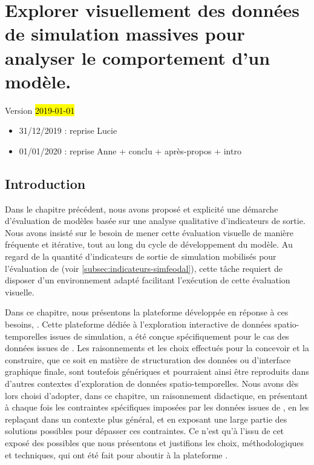 \setcounter{chapter}{3}
\graphicspath{{chap4/}}

\chapter{Explorer visuellement des données de simulation massives pour analyser le comportement d'un modèle.}
\label{chap:chap4}
\begin{center}
{\large Version \hl{2019-01-01}}
\end{center}
\begin{itemize}
	\item 31/12/2019 : reprise Lucie
	\item 01/01/2020 : reprise Anne + conclu + après-propos + intro
\end{itemize} 
\setcounter{minitocdepth}{2}
\minitoc
\clearpage
{}

\section*{Introduction}

Dans le chapitre précédent, nous avons proposé et explicité une démarche d'évaluation de modèles basée sur une analyse qualitative d'indicateurs de sortie.
Nous avons insisté sur le besoin de mener cette \og évaluation visuelle\fg{} de manière fréquente et itérative, tout au long du cycle de développement du modèle.
Au regard de la quantité d'indicateurs de sortie de simulation mobilisés pour l'évaluation de \simfeodal{} (voir \cref{subsec:indicateurs-simfeodal}), cette tâche requiert de disposer d'un environnement adapté facilitant l'exécution de cette évaluation visuelle.

Dans ce chapitre, nous présentons la plateforme développée en réponse à ces besoins, \simedb{}.
Cette plateforme dédiée à l'exploration interactive de données spatio-temporelles issues de simulation, a été conçue spécifiquement pour le cas des données issues de \simfeodal{}.
Les raisonnements et les choix effectués pour la concevoir et la construire, que ce soit en matière de structuration des données ou d'interface graphique finale, sont toutefois génériques et pourraient ainsi être reproduits dans d'autres contextes d'exploration de données spatio-temporelles.
Nous avons dès lors choisi d'adopter, dans ce chapitre, un raisonnement didactique, en présentant à chaque fois les contraintes spécifiques imposées par les données issues de \simfeodal{}, en les replaçant dans un contexte plus général, et en exposant une large partie des solutions possibles pour dépasser ces contraintes.
Ce n'est qu'à l'issu de cet exposé des possibles que nous présentons et justifions les choix, méthodologiques et techniques, qui ont été fait pour aboutir à la plateforme \simedb.	

